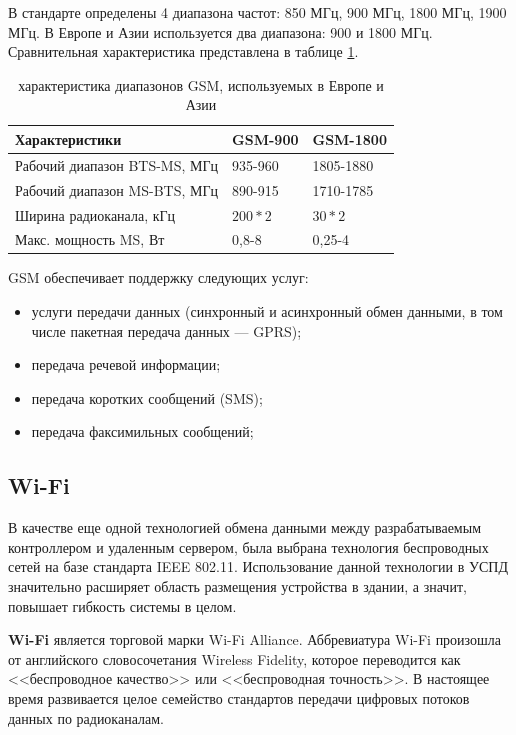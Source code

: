 В стандарте определены 4 диапазона частот: 850 МГц, 900 МГц, 1800 МГц, 1900 МГц. В Европе и Азии используется два диапазона: 900 и 1800 МГц. Сравнительная характеристика представлена в таблице \ref{gsmtable}.

\begin{table}[h!]
\caption{характеристика диапазонов GSM, используемых в Европе и Азии\cite{gsmchar}}
\label{gsmtable}
	\begin{tabular}{|m{70mm}|m{40mm}|m{40mm}|}
	\hline
	Характеристики & GSM-900 & GSM-1800\\
	\hline
	Рабочий диапазон BTS-MS, МГц & 935-960 & 1805-1880\\
	\hline
	Рабочий диапазон MS-BTS, МГц & 890-915 & 1710-1785\\
	\hline
	Ширина радиоканала, кГц & $200*2$ & $30*2$\\
	\hline
	Макс. мощность MS, Вт & 0,8-8 & 0,25-4 \\
	\hline
	\end{tabular}
\end{table}

GSM обеспечивает поддержку следующих услуг:
\begin{itemize}
\item услуги передачи данных (синхронный и асинхронный обмен данными, в том числе пакетная передача данных — GPRS);
\item передача речевой информации;
\item передача коротких сообщений (SMS);
\item передача факсимильных сообщений;
\end{itemize}

\newpage

\subsection{Wi-Fi}

В качестве еще одной технологией обмена данными между разрабатываемым контроллером и удаленным сервером, была выбрана технология беспроводных сетей на базе стандарта IEEE 802.11. Использование данной технологии в УСПД значительно расширяет область размещения устройства в здании, а значит, повышает гибкость системы в целом.

\textbf{Wi-Fi} является торговой марки Wi-Fi Alliance. Аббревиатура Wi-Fi произошла от английского словосочетания Wireless Fidelity, которое переводится как <<беспроводное качество>> или <<беспроводная точность>>. В настоящее время развивается целое семейство стандартов передачи цифровых потоков данных по радиоканалам.


